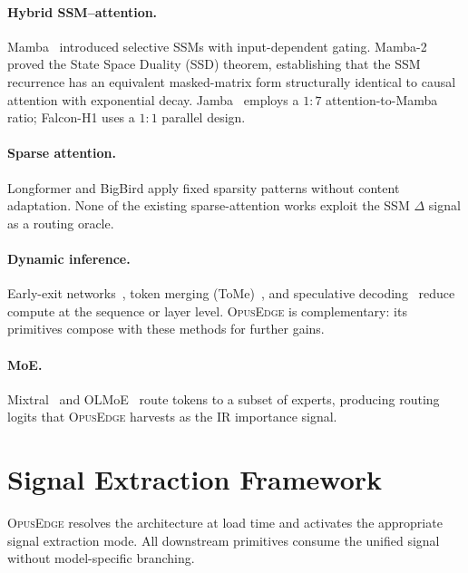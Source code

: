 \documentclass[11pt]{article}
\newcommand{\dsig}{\Delta}
\newcommand{\ir}{\mathrm{IR}}
\newcommand{\opusedge}{\textsc{OpusEdge}}
\begin{document}
\paragraph{Hybrid SSM--attention.}
Mamba~\cite{mamba1} introduced selective SSMs with input-dependent gating.
Mamba-2~\cite{mamba2ssd} proved the State Space Duality (SSD) theorem,
establishing that the SSM recurrence has an equivalent masked-matrix form
structurally identical to causal attention with exponential decay.
Jamba~\cite{jamba} employs a $1{:}7$ attention-to-Mamba ratio; Falcon-H1
\cite{falconh1} uses a $1{:}1$ parallel design.

\paragraph{Sparse attention.}
Longformer and BigBird apply fixed sparsity patterns without content
adaptation. None of the existing sparse-attention works exploit the SSM
$\dsig$ signal as a routing oracle.

\paragraph{Dynamic inference.}
Early-exit networks~\cite{cald}, token merging (ToMe)~\cite{tome}, and
speculative decoding~\cite{spec} reduce compute at the sequence or layer
level. \opusedge{} is complementary: its primitives compose with these
methods for further gains.

\paragraph{MoE.} Mixtral~\cite{mixtral} and OLMoE~\cite{olmoe} route tokens
to a subset of experts, producing routing logits that \opusedge{} harvests as
the $\ir$ importance signal.

\section{Signal Extraction Framework}
\opusedge{} resolves the architecture at load time and activates the
appropriate signal extraction mode. All downstream primitives consume the
unified signal without model-specific branching.
\end{document}
